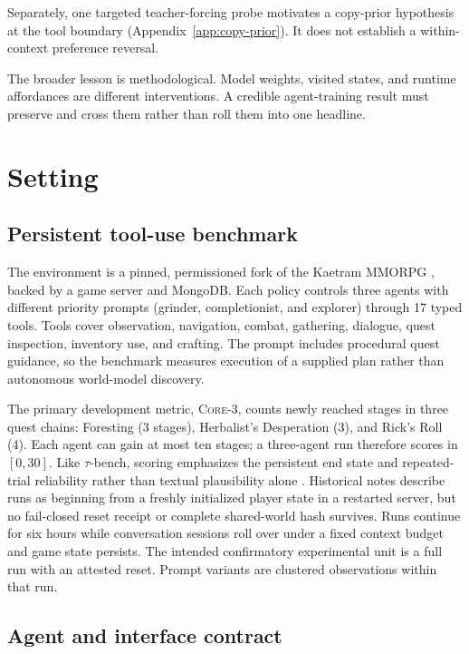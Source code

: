 \documentclass[11pt,a4paper]{article}
\newcommand{\core}{\textsc{Core-3}}
\begin{document}
Separately, one targeted teacher-forcing probe motivates a copy-prior
hypothesis at the tool boundary (Appendix~\ref{app:copy-prior}). It does not
establish a within-context preference reversal.

The broader lesson is methodological. Model weights, visited states, and
runtime affordances are different interventions. A credible agent-training
result must preserve and cross them rather than roll them into one headline.

\section{Setting}

\subsection{Persistent tool-use benchmark}

The environment is a pinned, permissioned fork of the Kaetram MMORPG
\citep{kaetram2026}, backed by a game server and MongoDB. Each policy controls
three agents with different priority
prompts (grinder, completionist, and explorer) through 17 typed tools. Tools
cover observation, navigation, combat, gathering, dialogue, quest inspection,
inventory use, and crafting. The prompt includes procedural quest guidance, so
the benchmark measures execution of a supplied plan rather than autonomous
world-model discovery.

The primary development metric, \core{}, counts newly reached stages in three
quest chains: Foresting (3 stages), Herbalist's Desperation (3), and Rick's Roll
(4). Each agent can gain at most ten stages; a three-agent run therefore scores
in $[0,30]$. Like $\tau$-bench, scoring emphasizes the persistent end state and
repeated-trial reliability rather than textual plausibility alone
\citep{yao2025taubench}. Historical notes describe runs as beginning from a freshly
initialized player state in a restarted server, but no fail-closed reset receipt
or complete shared-world hash survives. Runs continue for six hours while
conversation sessions roll over under a fixed context budget and game state
persists. The intended confirmatory experimental unit is a full run with an
attested reset. Prompt variants are clustered observations within that run.

\subsection{Agent and interface contract}
\end{document}
